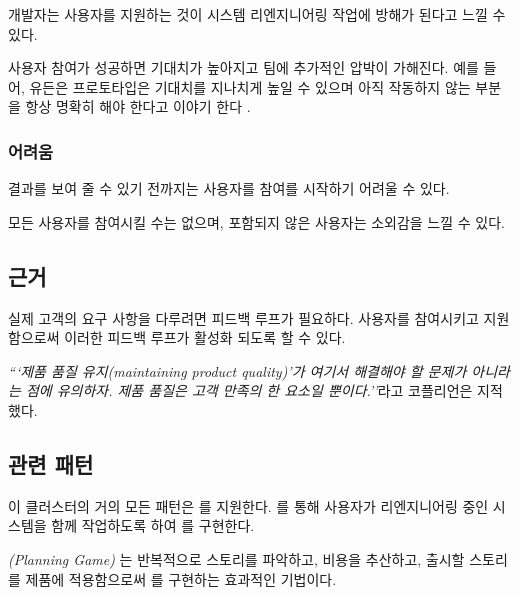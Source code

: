 \documentclass[a4paper,10pt,twoside]{book}
\begin{document}
\begin{bulletlist}
\item 개발자는 사용자를 지원하는 것이 시스템 리엔지니어링 작업에 방해가 된다고 느낄 수 있다.

\item 사용자 참여가 성공하면 기대치가 높아지고 팀에 추가적인 압박이 가해진다. 예를 들어, 유든은 프로토타입은 기대치를 지나치게 높일 수 있으며 아직 작동하지 않는 부분을 항상 명확히 해야 한다고 이야기 한다 \cite{Your97a}.
\end{bulletlist}

\subsubsection*{어려움}

\begin{bulletlist}
\item 결과를 보여 줄 수 있기 전까지는 사용자를 참여를 시작하기 어려울 수 있다.

\item 모든 사용자를 참여시킬 수는 없으며, 포함되지 않은 사용자는 소외감을 느낄 수 있다.
\end{bulletlist}

\subsection*{근거}

실제 고객의 요구 사항을 다루려면 피드백 루프가 필요하다. 사용자를 참여시키고 지원함으로써 이러한 피드백 루프가 활성화 되도록 할 수 있다.

\emph{```제품 품질 유지(maintaining product quality)'가 여기서 해결해야 할 문제가 아니라는 점에 유의하자. 제품 품질은 고객 만족의 한 요소일 뿐이다.''}라고 코플리언은 지적했다. \cite{Copl95d}

\subsection*{관련 패턴}

이 클러스터의 거의 모든 패턴은 를 지원한다. 를 통해 사용자가 리엔지니어링 중인 시스템을 함께 작업하도록 하여 를 구현한다.

\emph{(Planning Game)} \cite{Beck01a}는 반복적으로 스토리를 파악하고, 비용을 추산하고, 출시할 스토리를 제품에 적용함으로써 를 구현하는 효과적인 기법이다.
\end{document}
